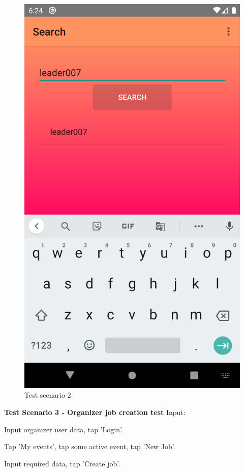	 		\begin{figure}[H]
	 			\includegraphics[width=\linewidth]{images/test_Screens/test_scenario_2-4.png}
	 			\caption{Test scenario 2}
	 			\label{fig:espresso_2_4}
	 		\end{figure}
	 		
	 		\textbf{Test Scenario 3 - Organizer job creation test}
	 		Input:
	 		\begin{packed_enum}
	 			\item Input organizer user data, tap 'Login'.
	 			\item Tap 'My events', tap some active event, tap 'New Job'.
	 			\item Input required data, tap 'Create job'.
	 		\end{packed_enum}
 		
